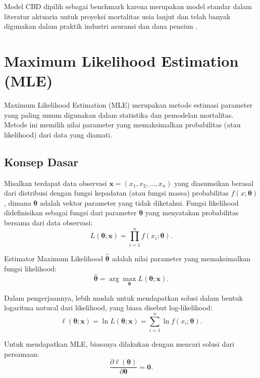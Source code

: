Model CBD dipilih sebagai benchmark karena merupakan model standar dalam literatur aktuaria untuk proyeksi mortalitas usia lanjut dan telah banyak digunakan dalam praktik industri asuransi dan dana pensiun \citep{villegas2018comparative}.

\section{Maximum Likelihood Estimation (MLE)}

Maximum Likelihood Estimation (MLE) merupakan metode estimasi parameter yang paling umum digunakan dalam statistika dan pemodelan mortalitas. Metode ini memilih nilai parameter yang memaksimalkan probabilitas (atau likelihood) dari data yang diamati.

\subsection{Konsep Dasar}

Misalkan terdapat data observasi $\mathbf{x} = (x_1, x_2, \ldots, x_n)$ yang diasumsikan berasal dari distribusi dengan fungsi kepadatan (atau fungsi massa) probabilitas $f(x; \boldsymbol{\theta})$, dimana $\boldsymbol{\theta}$ adalah vektor parameter yang tidak diketahui. Fungsi likelihood didefinisikan sebagai fungsi dari parameter $\boldsymbol{\theta}$ yang menyatakan probabilitas bersama dari data observasi:
\begin{equation}
L(\boldsymbol{\theta}; \mathbf{x}) = \prod_{i=1}^{n} f(x_i; \boldsymbol{\theta}).
\label{eq:likelihood_definition}
\end{equation}

Estimator Maximum Likelihood $\hat{\boldsymbol{\theta}}$ adalah nilai parameter yang memaksimalkan fungsi likelihood:
\begin{equation}
\hat{\boldsymbol{\theta}} = \arg\max_{\boldsymbol{\theta}} L(\boldsymbol{\theta}; \mathbf{x}).
\label{eq:mle_definition}
\end{equation}

Dalam pengerjaannya, lebih mudah untuk mendapatkan solusi dalam bentuk logaritma natural dari likelihood, yang biasa disebut log-likelihood:
\begin{equation}
\ell(\boldsymbol{\theta}; \mathbf{x}) = \ln L(\boldsymbol{\theta}; \mathbf{x}) = \sum_{i=1}^{n} \ln f(x_i; \boldsymbol{\theta}).
\label{eq:loglikelihood_definition}
\end{equation}

Untuk mendapatkan MLE, biasanya dilakukan dengan mencari solusi dari persamaan:
\begin{equation}
\frac{\partial \ell(\boldsymbol{\theta})}{\partial \boldsymbol{\theta}} = \mathbf{0}.
\label{eq:score_equation}
\end{equation}

